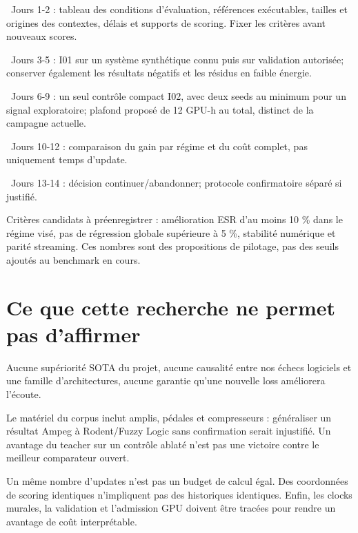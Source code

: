 \documentclass[10pt,a4paper]{article}
\begin{document}
\par\noindent\textbullet\ Jours 1-2 : tableau des conditions d'\'{e}valuation, r\'{e}f\'{e}rences ex\'{e}cutables, tailles et origines
  des contextes, d\'{e}lais et supports de scoring. Fixer les crit\`{e}res avant nouveaux scores.
\par\noindent\textbullet\ Jours 3-5 : I01 sur un syst\`{e}me synth\'{e}tique connu puis sur validation autoris\'{e}e; conserver
  \'{e}galement les r\'{e}sultats n\'{e}gatifs et les r\'{e}sidus en faible \'{e}nergie.
\par\noindent\textbullet\ Jours 6-9 : un seul contr\^{o}le compact I02, avec deux seeds au minimum pour un signal exploratoire;
  plafond propos\'{e} de 12 GPU-h au total, distinct de la campagne actuelle.
\par\noindent\textbullet\ Jours 10-12 : comparaison du gain par r\'{e}gime et du co\^{u}t complet, pas uniquement temps d'update.
\par\noindent\textbullet\ Jours 13-14 : d\'{e}cision continuer/abandonner; protocole confirmatoire s\'{e}par\'{e} si justifi\'{e}.

Crit\`{e}res candidats \`{a} pr\'{e}enregistrer : am\'{e}lioration ESR d'au moins 10 \% dans le r\'{e}gime vis\'{e},
pas de r\'{e}gression globale sup\'{e}rieure \`{a} 5 \%, stabilit\'{e} num\'{e}rique et parit\'{e} streaming.
Ces nombres sont des propositions de pilotage, pas des seuils ajout\'{e}s au benchmark en cours.

\section{Ce que cette recherche ne permet pas d'affirmer}

Aucune sup\'{e}riorit\'{e} SOTA du projet, aucune causalit\'{e} entre nos \'{e}checs logiciels et une famille
d'architectures, aucune garantie qu'une nouvelle loss am\'{e}liorera l'\'{e}coute.

Le mat\'{e}riel du corpus inclut amplis, p\'{e}dales et compresseurs : g\'{e}n\'{e}raliser un r\'{e}sultat Ampeg
\`{a} Rodent/Fuzzy Logic sans confirmation serait injustifi\'{e}. Un avantage du teacher sur un
contr\^{o}le ablat\'{e} n'est pas une victoire contre le meilleur comparateur ouvert.

Un m\^{e}me nombre d'updates n'est pas un budget de calcul \'{e}gal. Des coordonn\'{e}es de scoring
identiques n'impliquent pas des historiques identiques. Enfin, les clocks murales, la validation
et l'admission GPU doivent \^{e}tre trac\'{e}es pour rendre un avantage de co\^{u}t interpr\'{e}table.
\end{document}
